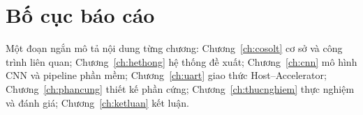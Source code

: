 \section{Bố cục báo cáo}\label{sec:bocuc}
\begin{goiy}
  Một đoạn ngắn mô tả nội dung từng chương: Chương~\ref{ch:cosolt} cơ sở và công trình liên quan;
  Chương~\ref{ch:hethong} hệ thống đề xuất; Chương~\ref{ch:cnn} mô hình CNN và pipeline phần mềm;
  Chương~\ref{ch:uart} giao thức Host--Accelerator; Chương~\ref{ch:phancung} thiết kế phần cứng;
  Chương~\ref{ch:thucnghiem} thực nghiệm và đánh giá; Chương~\ref{ch:ketluan} kết luận.
\end{goiy}
